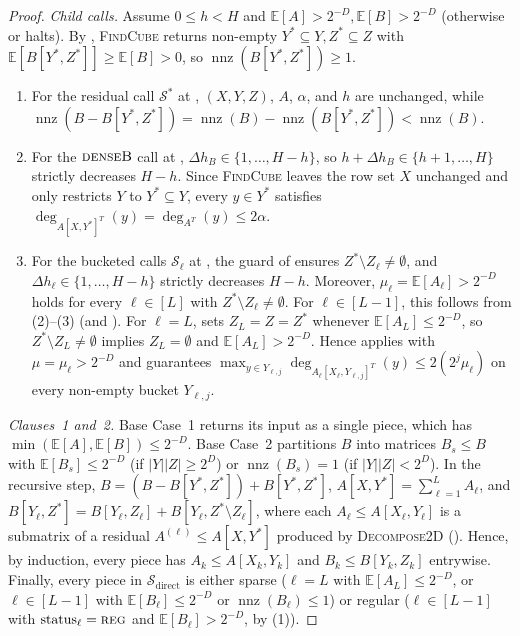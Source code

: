 \documentclass[11pt]{article}
\theoremstyle{definition}
\newcommand{\E}{\mathbb{E}}
\newcommand{\nnz}{\operatorname{nnz}}
\newcommand{\abs}[1]{\left\lvert #1 \right\rvert}
\newcommand{\dens}[1]{\E[#1]}
\newcommand{\DecomposeTwoD}{\textnormal{\textsc{Decompose2D}}}
\newcommand{\FindCube}{\textnormal{\textsc{FindCube}}}
\newcommand{\tagreg}{\textnormal{\textsc{reg}}}
\newcommand{\tagdenseB}{\textnormal{\textsc{denseB}}}
\begin{document}
\begin{proof}
\emph{Child calls.} Assume $0 \le h < H$ and $\dens{A} > 2^{-D}, \dens{B} > 2^{-D}$ (otherwise  or  halts). By , \FindCube{} returns non-empty $Y^* \subseteq Y, Z^* \subseteq Z$ with $\dens{B[Y^*, Z^*]} \ge \dens{B} > 0$, so $\nnz(B[Y^*, Z^*]) \ge 1$.
\begin{enumerate}[leftmargin=*]
    \item For the residual call $\mathcal{S}^*$ at , $(X, Y, Z)$, $A$, $\alpha$, and $h$ are unchanged, while $\nnz(B - B[Y^*, Z^*]) = \nnz(B) - \nnz(B[Y^*, Z^*]) < \nnz(B)$.
    \item For the $\tagdenseB$ call at , $\Delta h_B \in \{1, \dots, H - h\}$, so $h + \Delta h_B \in \{h+1, \dots, H\}$ strictly decreases $H - h$. Since \FindCube{} leaves the row set $X$ unchanged and only restricts $Y$ to $Y^* \subseteq Y$, every $y \in Y^*$ satisfies $\deg_{A[X, Y^*]^T}(y) = \deg_{A^T}(y) \le 2\alpha$.
    \item For the bucketed calls $\mathcal{S}_\ell$ at , the guard of  ensures $Z^* \setminus Z_\ell \ne \emptyset$, and $\Delta h_\ell \in \{1, \dots, H - h\}$ strictly decreases $H - h$. Moreover, $\mu_\ell = \dens{A_\ell} > 2^{-D}$ holds for every $\ell \in [L]$ with $Z^* \setminus Z_\ell \ne \emptyset$. For $\ell \in [L-1]$, this follows from (2)--(3) (and ). For $\ell = L$,  sets $Z_L = Z = Z^*$ whenever $\dens{A_L} \le 2^{-D}$, so $Z^* \setminus Z_L \ne \emptyset$ implies $Z_L = \emptyset$ and $\dens{A_L} > 2^{-D}$. Hence  applies with $\mu = \mu_\ell > 2^{-D}$ and guarantees $\max_{y \in Y_{\ell, j}}\deg_{A_\ell[X_\ell, Y_{\ell, j}]^T}(y) \le 2(2^j\mu_\ell)$ on every non-empty bucket $Y_{\ell, j}$.
\end{enumerate}

\emph{Clauses~1 and~2.} Base Case~1 returns its input as a single piece, which has $\min(\dens{A}, \dens{B}) \le 2^{-D}$. Base Case~2 partitions $B$ into matrices $B_s \le B$ with $\dens{B_s} \le 2^{-D}$ (if $\abs{Y}\abs{Z} \ge 2^D$) or $\nnz(B_s) = 1$ (if $\abs{Y}\abs{Z} < 2^D$). In the recursive step, $B = (B - B[Y^*, Z^*]) + B[Y^*, Z^*]$, $A[X, Y^*] = \sum_{\ell=1}^L A_\ell$, and $B[Y_\ell, Z^*] = B[Y_\ell, Z_\ell] + B[Y_\ell, Z^* \setminus Z_\ell]$, where each $A_\ell \le A[X_\ell, Y_\ell]$ is a submatrix of a residual $A^{(\ell)} \le A[X, Y^*]$ produced by \DecomposeTwoD{} (). Hence, by induction, every piece has $A_k \le A[X_k, Y_k]$ and $B_k \le B[Y_k, Z_k]$ entrywise. Finally, every piece in $\mathcal{S}_{\text{direct}}$ is either sparse ($\ell = L$ with $\dens{A_L} \le 2^{-D}$, or $\ell \in [L-1]$ with $\dens{B_\ell} \le 2^{-D}$ or $\nnz(B_\ell) \le 1$) or regular ($\ell \in [L-1]$ with $\text{status}_\ell = \tagreg$ and $\dens{B_\ell} > 2^{-D}$, by (1)).
\end{proof}
\end{document}
